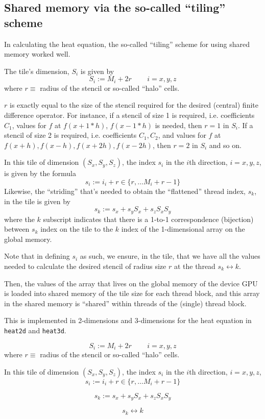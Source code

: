 \documentclass[10pt, landscape]{amsart}
\begin{document}
\subsection{Shared memory via the so-called ``tiling'' scheme}

In calculating the heat equation, the so-called ``tiling'' scheme for using shared memory worked well.

The tile's dimension, $S_i$ is given by
\[
S_i := M_i  +2r  \qquad \, i = x,y,z
\]
where $r \equiv $ radius of the stencil or so-called ``halo'' cells.  

$r$ is exactly equal to the size of the stencil required for the desired (central) finite difference operator.  For instance, if a stencil of size 1 is required, i.e. coefficients $C_1$, values for $f$ at $f(x + 1*h)$, $f(x-1*h)$ is needed, then $r=1$ in $S_i$.  If a stencil of size 2 is required, i.e. coefficients $C_1, C_2$, and values for $f$ at $f(x+h), f(x-h), f(x+2h), f(x-2h)$, then $r=2$ in $S_i$ and so on.

In this tile of dimension $(S_x,S_y,S_z)$, the index $s_i$ in the $i$th direction, $i=x,y,z$, is given by the formula
\[
s_i := i_i + r\in \lbrace r, \dots M_i + r-1\rbrace
\]
Likewise, the ``striding'' that's needed to obtain the ``flattened'' thread index, $s_k$, in the tile is given by
\[
s_k := s_x + s_y S_x + s_z S_x S_y 
\]
where the $k$ subscript indicates that there is a 1-to-1 correspondence (bijection) between $s_k$ index on the tile to the $k$ index of the 1-dimensional array on the global memory.  

Note that in defining $s_i$ as such, we ensure, in the tile, that we have all the values needed to calculate the desired stencil of radius size $r$ at the thread $s_k \leftrightarrow k$.  

Then, the values of the array that lives on the global memory of the device GPU is loaded into shared memory of the tile size for each thread block, and this array in the shared memory is ``shared'' within threads of the (single) thread block.  

This is implemented in 2-dimensions and 3-dimensions for the heat equation in \verb|heat2d| and \verb|heat3d|.  

\pagebreak

{\Huge

\[
S_i := M_i  +2r  \qquad \, i = x,y,z
\]
where $r \equiv $ radius of the stencil or so-called ``halo'' cells.  

In this tile of dimension $(S_x,S_y,S_z)$, the index $s_i$ in the $i$th direction, $i=x,y,z$, 
\[
s_i := i_i + r\in \lbrace r, \dots M_i + r-1\rbrace
\]

\[
s_k := s_x + s_y S_x + s_z S_x S_y 
\]

\[
s_k \longleftrightarrow k 
\]
}
\end{document}
